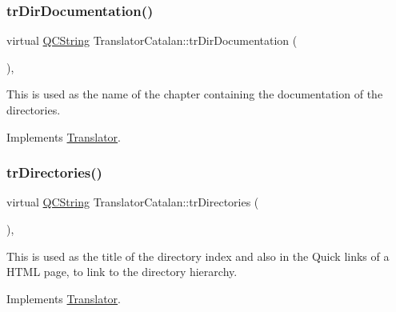 \mbox{\label{class_translator_catalan_a35ee90edf120bd24a070d977fd796b8b}} 
\subsubsection{\texorpdfstring{trDirDocumentation()}{trDirDocumentation()}}
{\footnotesize\ttfamily virtual \mbox{\hyperlink{class_q_c_string}{Q\+C\+String}} Translator\+Catalan\+::tr\+Dir\+Documentation (\begin{DoxyParamCaption}{ }\end{DoxyParamCaption})\hspace{0.3cm}{\ttfamily [inline]}, {\ttfamily [virtual]}}

This is used as the name of the chapter containing the documentation of the directories. 

Implements \mbox{\hyperlink{class_translator}{Translator}}.

\mbox{\label{class_translator_catalan_a42d6fbca39eebb41bc45c4e52c1040d2}} 
\subsubsection{\texorpdfstring{trDirectories()}{trDirectories()}}
{\footnotesize\ttfamily virtual \mbox{\hyperlink{class_q_c_string}{Q\+C\+String}} Translator\+Catalan\+::tr\+Directories (\begin{DoxyParamCaption}{ }\end{DoxyParamCaption})\hspace{0.3cm}{\ttfamily [inline]}, {\ttfamily [virtual]}}

This is used as the title of the directory index and also in the Quick links of a H\+T\+ML page, to link to the directory hierarchy. 

Implements \mbox{\hyperlink{class_translator}{Translator}}.

\mbox{\label{class_translator_catalan_af5f2f7009a829430020cdfeccd31fb11}} 
